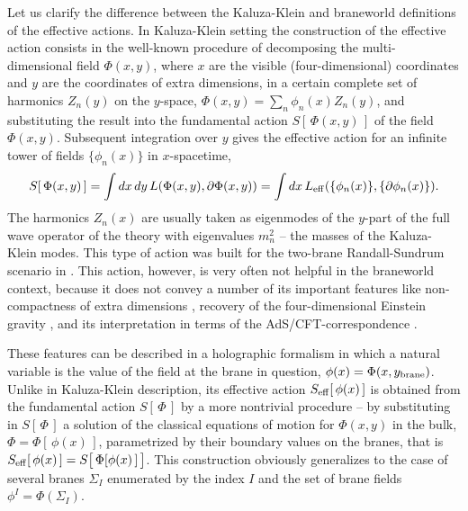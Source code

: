 \documentclass[a4paper,12pt]{article}
\begin{document}
Let us clarify the difference between the Kaluza-Klein and
braneworld definitions of the effective actions. In Kaluza-Klein
setting the construction of the effective action consists in the
well-known procedure of decomposing the multi-dimensional field
$\Phi(x,y)$, where $x$ are the visible (four-dimensional)
coordinates and $y$ are the coordinates of extra dimensions, in a
certain complete set of harmonics $Z_n(y)$ on the $y$-space,
$\Phi(x,y)=\sum_n\phi_n(x)Z_n(y)$, and substituting the result
into the fundamental action $S[\,\Phi(x,y)\,]$ of the field
$\Phi(x,y)$. Subsequent integration over $y$ gives the effective
action for an infinite tower of fields $\{\phi_n(x)\}$ in
$x$-spacetime,
    \begin{equation}
    S[\,\Phi(x,y)\,]=
    \int dx\,dy\,L(\Phi(x,y),\partial\Phi(x,y))=
    \int dx\,L_{\rm eff}
    (\{\phi_n(x)\},\{\partial\phi_n(x)\}).  \label{1}
\end{equation}
The harmonics $Z_n(x)$ are usually taken as eigenmodes of the
$y$-part of the full wave operator of the theory with eigenvalues
$m_n^2$ -- the masses of the Kaluza-Klein modes. This type of action
was built for the two-brane Randall-Sundrum scenario
in \cite{KubVol}.  This  action, however, is very often not
helpful in the braneworld context, because it does not convey a
number of its important features like non-compactness of extra
dimensions \cite{RSloc,Rub}, recovery of the four-dimensional
Einstein gravity \cite{GT}, and its interpretation in terms of the
AdS/CFT-correspondence \cite{Gubser,GKR}.

These features can be described in a holographic formalism in which
a natural variable is the value of the field at the brane in question,
$\phi(x)=\Phi(x,y_{\rm brane})$. Unlike in Kaluza-Klein description,
its effective action $S_{\rm eff}[\,\phi(x)\,]$ is obtained from
the fundamental action $S[\,\Phi\,]$ by a more nontrivial
procedure -- by substituting in $S[\,\Phi\,]$ a solution of the
classical equations of motion for $\Phi(x,y)$ in the bulk,
$\Phi=\Phi[\,\phi(x)\,]$, parametrized by their boundary values on
the branes, that is $S_{\rm eff}[\,\phi(x)\,]
=S\big[\,\Phi[\phi(x)\,]\,\big]$. This construction obviously
generalizes to the case of several branes $\Sigma_I$ enumerated by
the index $I$ and the set of brane fields $\phi^I=\Phi(\Sigma_I)$.
\end{document}
